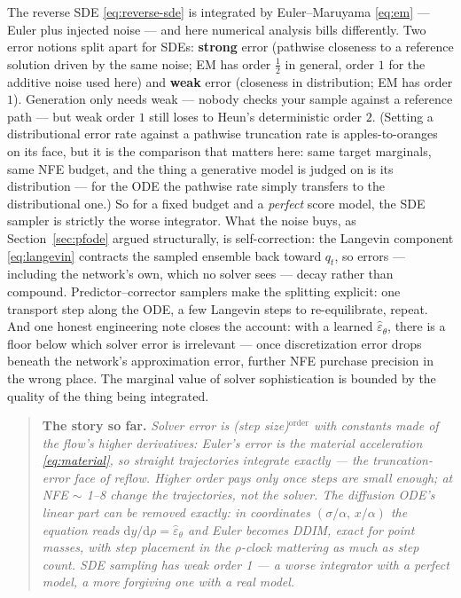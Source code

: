 \documentclass[10pt,a4paper]{article}
\newenvironment{recap}
{\par\medskip\noindent\begin{quote}\small\textbf{The story so far.}\itshape\;}
{\end{quote}\medskip}
\newcommand{\dd}{\mathrm{d}}
\newcommand{\veps}{\varepsilon}
\begin{document}
The reverse SDE \eqref{eq:reverse-sde} is integrated by Euler--Maruyama
\eqref{eq:em} --- Euler plus injected noise --- and here numerical
analysis bills differently. Two error notions split apart for SDEs:
\textbf{strong} error (pathwise closeness to a reference solution driven
by the same noise; EM has order $\tfrac12$ in general, order $1$ for the
additive noise used here) and \textbf{weak} error
(closeness in distribution; EM has order $1$). Generation only needs
weak --- nobody checks your sample against a reference path --- but weak
order $1$ still loses to Heun's deterministic order $2$. (Setting a
distributional error rate against a pathwise truncation rate is
apples-to-oranges on its face, but it is the comparison that matters
here: same target marginals, same NFE budget, and the thing a generative
model is judged on is its distribution --- for the ODE the pathwise rate
simply transfers to the distributional one.) So for a fixed
budget and a \emph{perfect} score model, the SDE sampler is strictly the
worse integrator. What the noise buys, as Section~\ref{sec:pfode} argued
structurally, is self-correction: the Langevin component
\eqref{eq:langevin} contracts the sampled ensemble back toward $q_t$, so
errors --- including the network's own, which no solver sees --- decay
rather than compound. Predictor--corrector samplers make the splitting
explicit: one transport step along the ODE, a few Langevin steps to
re-equilibrate, repeat. And one honest engineering note closes the
account: with a learned $\hat\veps_\theta$, there is a floor below which
solver error is irrelevant --- once discretization error drops beneath
the network's approximation error, further NFE purchase precision in the
wrong place. The marginal value of solver sophistication is bounded by
the quality of the thing being integrated.

\begin{recap}
Solver error is (step size)$^{\text{order}}$ with constants made of the
flow's higher derivatives: Euler's error is the material acceleration
\eqref{eq:material}, so straight trajectories integrate exactly --- the
truncation-error face of reflow. Higher order pays only once steps are
small enough; at NFE $\sim$ 1--8 change the trajectories, not the
solver. The diffusion ODE's linear part can be removed exactly: in
coordinates $(\sigma/\alpha,\, x/\alpha)$ the equation reads
$\dd y / \dd\rho = \hat\veps_\theta$ and Euler becomes DDIM, exact for
point masses, with step \emph{placement} in the $\rho$-clock mattering
as much as step count. SDE sampling has weak order 1 --- a worse
integrator with a perfect model, a more forgiving one with a real model.
\end{recap}
\end{document}
